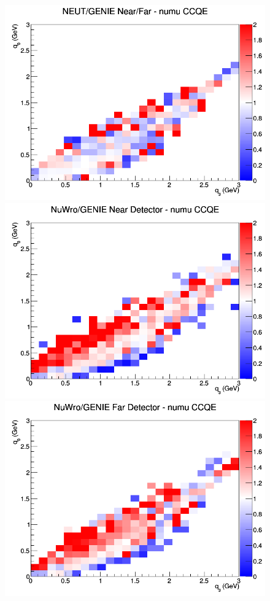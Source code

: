 \begin{figure}[h]
\endminipage
{}
\includegraphics[width=\linewidth]{eff_q0_q3/LAr/ratios/CCQE_NEUT_GENIE_numu_NF_q3_q0.png}
\endminipage
\newline
{}
\includegraphics[width=\linewidth]{eff_q0_q3/LAr/ratios/CCQE_NuWro_GENIE_numu_near_q3_q0.png}
\endminipage
{}
\includegraphics[width=\linewidth]{eff_q0_q3/LAr/ratios/CCQE_NuWro_GENIE_numu_far_q3_q0.png}

\end{figure}
